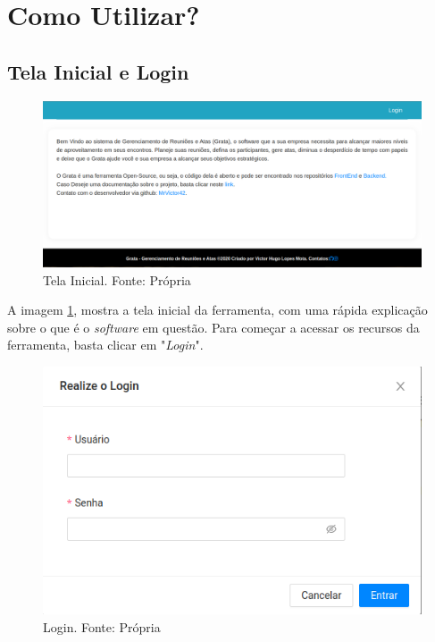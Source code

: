 \section{Como Utilizar?}

\subsection{Tela Inicial e Login}

\begin{figure}[H]
    \centering
    \includegraphics[width=1.0\textwidth]{figuras/tela_inicial.png}
    \caption{Tela Inicial. Fonte: Própria}
    \label{img:tela_inicial}
\end{figure}

A imagem \ref{img:tela_inicial}, mostra a tela inicial da ferramenta, com uma rápida explicação sobre o que é o \textit{software} em questão. Para começar a acessar os recursos da ferramenta, basta clicar em "\textit{Login}".

\begin{figure}[H]
    \centering
    \includegraphics[width=1.0\textwidth]{figuras/tela_login.png}
    \caption{Login. Fonte: Própria}
    \label{img:tela_login}
\end{figure}

